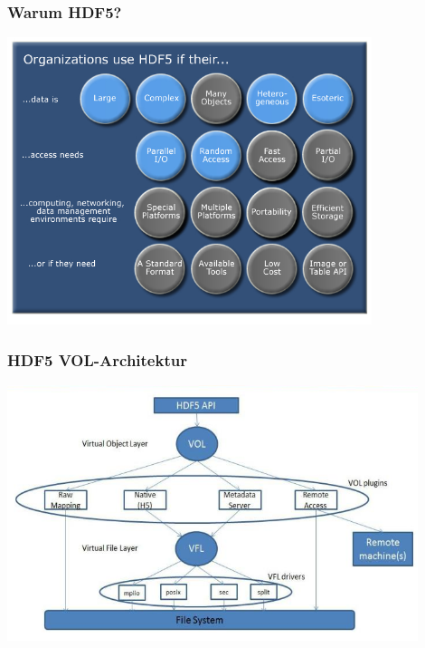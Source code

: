 \begin{frame}
	\frametitle{Warum HDF5?}
	\centering
	\includegraphics[width=0.8\textwidth]{pictures/why.jpg}
\end{frame}


\begin{frame}
	\frametitle{HDF5 VOL-Architektur}
	\centering
	\includegraphics[width=0.9\textwidth]{pictures/vol.png}
\end{frame}




